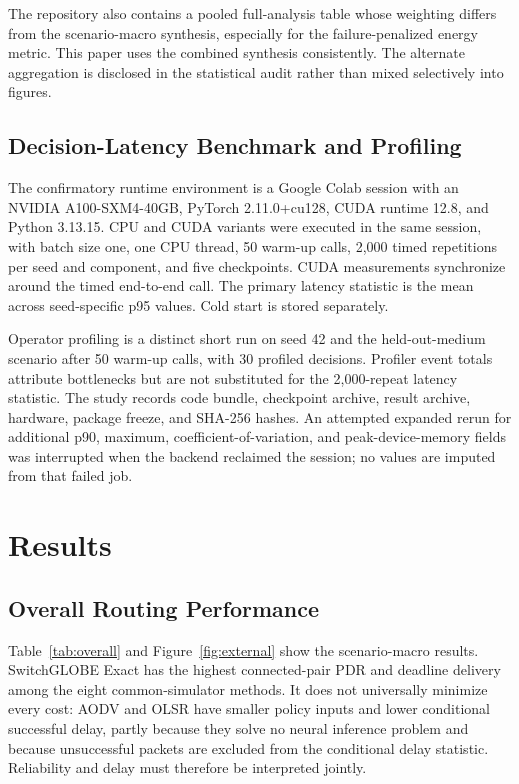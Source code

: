 \documentclass{ieeeaccess}
\newcommand{\SG}{SwitchGLOBE}
\begin{document}
The repository also contains a pooled full-analysis table whose weighting differs from the scenario-macro synthesis, especially for the failure-penalized energy metric. This paper uses the combined synthesis consistently. The alternate aggregation is disclosed in the statistical audit rather than mixed selectively into figures.

\subsection{Decision-Latency Benchmark and Profiling}

The confirmatory runtime environment is a Google Colab session with an NVIDIA A100-SXM4-40GB, PyTorch 2.11.0+cu128, CUDA runtime 12.8, and Python 3.13.15. CPU and CUDA variants were executed in the same session, with batch size one, one CPU thread, 50 warm-up calls, 2,000 timed repetitions per seed and component, and five checkpoints. CUDA measurements synchronize around the timed end-to-end call. The primary latency statistic is the mean across seed-specific p95 values. Cold start is stored separately.

Operator profiling is a distinct short run on seed 42 and the held-out-medium scenario after 50 warm-up calls, with 30 profiled decisions. Profiler event totals attribute bottlenecks but are not substituted for the 2,000-repeat latency statistic. The study records code bundle, checkpoint archive, result archive, hardware, package freeze, and SHA-256 hashes. An attempted expanded rerun for additional p90, maximum, coefficient-of-variation, and peak-device-memory fields was interrupted when the backend reclaimed the session; no values are imputed from that failed job.

\section{Results}

\subsection{Overall Routing Performance}

Table~\ref{tab:overall} and Figure~\ref{fig:external} show the scenario-macro results. \SG{} Exact has the highest connected-pair PDR and deadline delivery among the eight common-simulator methods. It does not universally minimize every cost: AODV and OLSR have smaller policy inputs and lower conditional successful delay, partly because they solve no neural inference problem and because unsuccessful packets are excluded from the conditional delay statistic. Reliability and delay must therefore be interpreted jointly.
\end{document}
